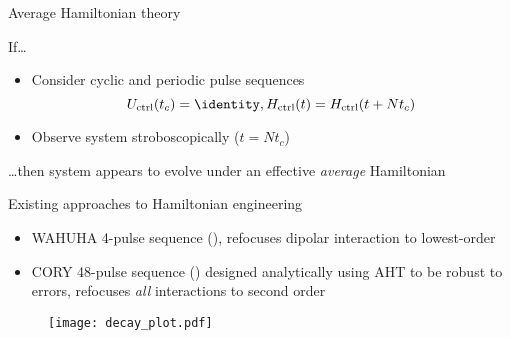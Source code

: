 \documentclass{beamer}
\begin{document}
\begin{frame}{Average Hamiltonian theory}

If\dots
\begin{itemize}
    \item Consider cyclic and periodic pulse sequences
    \[
    U_{\text{ctrl}}(t_c) = \identity, H_{\text{ctrl}}(t) = H_{\text{ctrl}}(t + Nt_c)
    \]
    \item Observe system stroboscopically ($t = Nt_c$)
\end{itemize}
\dots then system appears to evolve under an effective \emph{average} Hamiltonian

\begin{figure}
\centering
\scalebox{.7}{

}
\end{figure}


\end{frame}

\begin{frame}{Existing approaches to Hamiltonian engineering}

\begin{itemize}
    \item WAHUHA 4-pulse sequence (\cite{PhysRevLett.20.180}), refocuses dipolar interaction to lowest-order
    
    \item CORY 48-pulse sequence (\cite{CORY1990205}) designed analytically using AHT to be robust to errors, refocuses \emph{all} interactions to second order
\end{itemize}

\begin{figure}
\centering
\texttt{[image: decay\_plot.pdf]}
\end{figure}


\end{frame}
\end{document}
